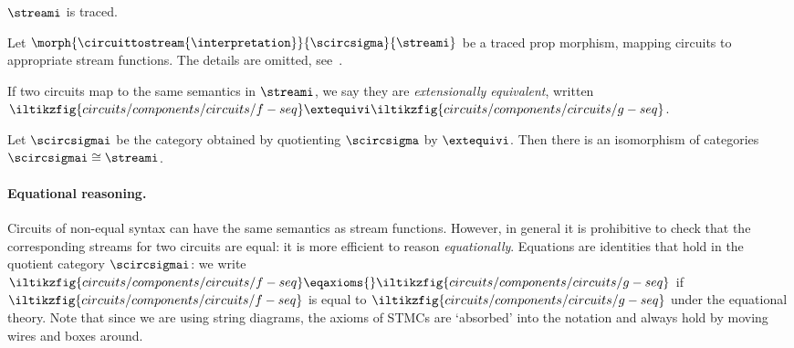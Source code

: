 \documentclass[10pt]{article}
\begin{document}
    \begin{theorem}
        \(\streami\) is traced.
    \end{theorem}

    \begin{definition}\label{def:circuittostreams}
        Let \(\morph{\circuittostream{\interpretation}}{\scircsigma}{\streami}\) be a traced prop morphism, mapping circuits to appropriate stream functions.
        The details are omitted, see~\cite{ghica2022full}.
    \end{definition}

    \noindent
    If two circuits map to the same semantics in \(\streami\), we say they are \emph{extensionally equivalent}, written \(\iltikzfig{circuits/components/circuits/f-seq} \extequivi \iltikzfig{circuits/components/circuits/g-seq}\).

    \begin{theorem}
        Let \(\scircsigmai\) be the category obtained by quotienting \(\scircsigma\) by \(\extequivi\).
        Then there is an isomorphism of categories \(\scircsigmai \cong \streami\).
    \end{theorem}

    \paragraph*{Equational reasoning.}

    Circuits of non-equal syntax can have the same semantics as stream functions.
    However, in general it is prohibitive to check that the corresponding streams for two circuits are equal: it is more efficient to reason \emph{equationally}.
    Equations are identities that hold in the quotient category \(\scircsigmai\): we write \(\iltikzfig{circuits/components/circuits/f-seq} \eqaxioms{} \iltikzfig{circuits/components/circuits/g-seq}\) if \(\iltikzfig{circuits/components/circuits/f-seq}\) is equal to \(\iltikzfig{circuits/components/circuits/g-seq}\) under the equational theory.
    Note that since we are using string diagrams, the axioms of STMCs are `absorbed' into the notation and always hold by moving wires and boxes around.
\end{document}
